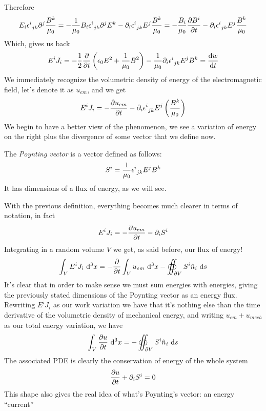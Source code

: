 \documentclass[../electromagnetism]{subfiles}
\begin{document}
Therefore
\begin{equation*}
	E_i\epsilon^{i}_{\ jk}\partial^j\frac{B^k}{\mu_0}=-\frac{1}{\mu_0}B_i\epsilon^{i}_{\ jk}\partial^jE^k-\partial_i\epsilon^{i}_{\ jk}E^j\frac{B^k}{\mu_0}=-\frac{B_i}{\mu_0}\pdv{B^i}{t}-\partial_i\epsilon^{i}_{\ jk}E^j\frac{B^k}{\mu_0}
\end{equation*}
Which, gives us back
\begin{equation}
	E^iJ_i=-\frac{1}{2}\pdv{t}\left( \epsilon_0E^2+\frac{1}{\mu_0}B^2 \right)-\frac{1}{\mu_0}\partial_i\epsilon^{i}_{\ jk}E^jB^k=\dv{w}{t}
	\label{eq:diffworkpoynting}
\end{equation}
We immediately recognize the volumetric density of energy of the electromagnetic field, let's denote it as $u_{em}$, and we get
\begin{equation}
	E^iJ_i=-\pdv{u_{em}}{t}-\partial_i\epsilon^{i}_{\ jk}E^j\left( \frac{B^k}{\mu_0} \right)
	\label{eq:poynting-1}
\end{equation}
We begin to have a better view of the phenomenon, we see a variation of energy on the right plus the divergence of some vector that we define now.
\begin{dfn}
	The \textit{Poynting vector} is a vector defined as follows:
	\begin{equation}
		S^i=\frac{1}{\mu_0}\epsilon^{i}_{\ jk}E^jB^k
		\label{eq:poyntingdef}
	\end{equation}
	It has dimensions of a flux of energy, as we will see.
\end{dfn}
With the previous definition, everything becomes much clearer in terms of notation, in fact
\begin{equation*}
	E^iJ_i=-\pdv{u_{em}}{t}-\partial_iS^i
\end{equation*}
Integrating in a random volume $V$ we get, as said before, our flux of energy!
\begin{equation*}
	\int_VE^iJ_i\ \mathrm{d}^3x=-\pdv{t}\int_Vu_{em}\ \mathrm{d}^3x - \oiint_{\partial V}S^i\hat{n}_i\ \mathrm{d} s
\end{equation*}
It's clear that in order to make sense we must sum energies with energies, giving the previously stated dimensions of the Poynting vector as an energy flux.\\
Rewriting $E^iJ_i$ as our work variation we have that it's nothing else than the time derivative of the volumetric density of mechanical energy, and writing $u_{em}+u_{mech}$ as our total energy variation, we have
\begin{equation}
	\int_{V}^{}\pdv{u}{t}\ \mathrm{d}^3{x}=-\oiint_{\partial V}S^i\hat{n}_i\ \mathrm{d} s
	\label{eq:energyvariationpoynting}
\end{equation}
The associated PDE is clearly the conservation of energy of the whole system
\begin{equation}
	\pdv{u}{t}+\partial_iS^i=0
	\label{eq:energyconspoynting}
\end{equation}
This shape also gives the real idea of what's Poynting's vector: an energy ``current'' 
\end{document}
